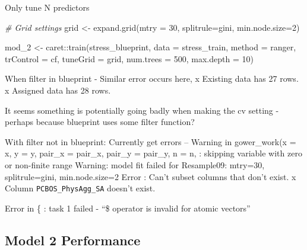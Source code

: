 \documentclass[
]{article}
\newenvironment{Shaded}{\begin{snugshade}}{\end{snugshade}}
\newcommand{\AttributeTok}[1]{\textcolor[rgb]{0.77,0.63,0.00}{#1}}
\newcommand{\CommentTok}[1]{\textcolor[rgb]{0.56,0.35,0.01}{\textit{#1}}}
\newcommand{\DecValTok}[1]{\textcolor[rgb]{0.00,0.00,0.81}{#1}}
\newcommand{\FunctionTok}[1]{\textcolor[rgb]{0.00,0.00,0.00}{#1}}
\newcommand{\NormalTok}[1]{#1}
\newcommand{\OtherTok}[1]{\textcolor[rgb]{0.56,0.35,0.01}{#1}}
\newcommand{\SpecialCharTok}[1]{\textcolor[rgb]{0.00,0.00,0.00}{#1}}
\newcommand{\StringTok}[1]{\textcolor[rgb]{0.31,0.60,0.02}{#1}}
\begin{document}
Only tune N predictors

\begin{Shaded}
\begin{Highlighting}[]
\CommentTok{\# Grid settings}
\NormalTok{grid }\OtherTok{\textless{}{-}} \FunctionTok{expand.grid}\NormalTok{(}\AttributeTok{mtry =} \DecValTok{30}\NormalTok{,}
                    \AttributeTok{splitrule=}\StringTok{\textquotesingle{}gini\textquotesingle{}}\NormalTok{,}
                    \AttributeTok{min.node.size=}\DecValTok{2}\NormalTok{)}


\NormalTok{mod\_2 }\OtherTok{\textless{}{-}}\NormalTok{ caret}\SpecialCharTok{::}\FunctionTok{train}\NormalTok{(stress\_blueprint,}
                        \AttributeTok{data      =}\NormalTok{ stress\_train,}
                        \AttributeTok{method    =} \StringTok{\textquotesingle{}ranger\textquotesingle{}}\NormalTok{,}
                        \AttributeTok{trControl =}\NormalTok{ cf,}
                        \AttributeTok{tuneGrid  =}\NormalTok{ grid,}
                        \AttributeTok{num.trees =} \DecValTok{500}\NormalTok{,}
                        \AttributeTok{max.depth =} \DecValTok{10}\NormalTok{)}
\end{Highlighting}
\end{Shaded}

When filter in blueprint - Similar error occurs here, x Existing data
has 27 rows. x Assigned data has 28 rows.

It seems something is potentially going badly when making the cv setting
- perhaps because blueprint uses some filter function?

With filter not in blueprint: Currently get errors -- Warning in
gower\_work(x = x, y = y, pair\_x = pair\_x, pair\_y = pair\_y, n = n, :
skipping variable with zero or non-finite range Warning: model fit
failed for Resample09: mtry=30, splitrule=gini, min.node.size=2 Error :
Can't subset columns that don't exist. x Column
\texttt{PCBOS\_PhysAgg\_SA} doesn't exist.

Error in \{ : task 1 failed - ``\$ operator is invalid for atomic
vectors''

\hypertarget{model-2-performance}{%
\subsection{Model 2 Performance}\label{model-2-performance}}
\end{document}
